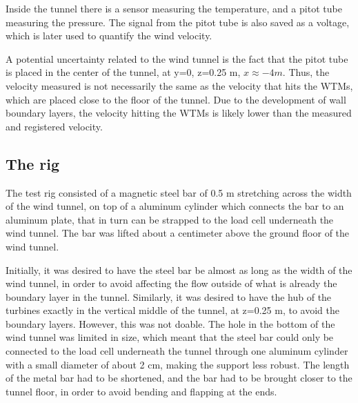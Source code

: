 Inside the tunnel there is a sensor measuring the temperature, and a pitot tube measuring the pressure. The signal from the pitot tube is also saved as a voltage, which is later used to quantify the wind velocity.  

A potential uncertainty related to the wind tunnel is the fact that the pitot tube is placed in the center of the tunnel, at y=0, z=0.25 m, $x \approx -4 m$. Thus, the velocity measured is not necessarily the same as the velocity that hits the \gls{WTM}s, which are placed close to the floor of the tunnel. Due to the development of wall boundary layers, the velocity hitting the \gls{WTM}s is likely lower than the measured and registered velocity. 


\subsection{The rig} 
The test rig consisted of a magnetic steel bar of 0.5 m stretching across the width of the wind tunnel, on top of a aluminum cylinder which connects the bar to an aluminum plate, that in turn can be strapped to the load cell underneath the wind tunnel. The bar was lifted about a centimeter above the ground floor of the wind tunnel. 

Initially, it was desired to have the steel bar be almost as long as the width of the wind tunnel, in order to avoid affecting the flow outside of what is already the boundary layer in the tunnel. Similarly, it was desired to have the hub of the turbines exactly in the vertical middle of the tunnel, at z=0.25 m, to avoid the boundary layers. However, this was not doable. The hole in the bottom of the wind tunnel was limited in size, which meant that the steel bar could only be connected to the load cell underneath the tunnel through one aluminum cylinder with a small diameter of about 2 cm, making the support less robust. The length of the metal bar had to be shortened, and the bar had to be brought closer to the tunnel floor, in order to avoid bending and flapping at the ends.







